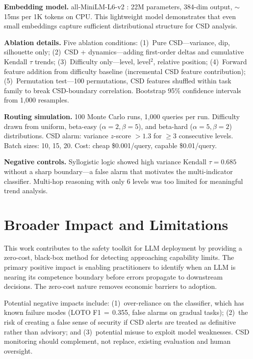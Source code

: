 \documentclass[11pt,letterpaper]{article}
\begin{document}
\textbf{Embedding model.} all-MiniLM-L6-v2 \cite{reimers2019}: 22M parameters, 384-dim output, ${\sim}$15ms per 1K tokens on CPU. This lightweight model demonstrates that even small embeddings capture sufficient distributional structure for CSD analysis.

\textbf{Ablation details.} Five ablation conditions: (1)~Pure CSD---variance, dip, silhouette only; (2)~CSD + dynamics---adding first-order deltas and cumulative Kendall $\tau$ trends; (3)~Difficulty only---level, level$^2$, relative position; (4)~Forward feature addition from difficulty baseline (incremental CSD feature contribution); (5)~Permutation test---100 permutations, CSD features shuffled within task family to break CSD-boundary correlation. Bootstrap 95\% confidence intervals from 1,000 resamples.

\textbf{Routing simulation.} 100 Monte Carlo runs, 1,000 queries per run. Difficulty drawn from uniform, beta-easy ($\alpha{=}2, \beta{=}5$), and beta-hard ($\alpha{=}5, \beta{=}2$) distributions. CSD alarm: variance $z$-score $> 1.3$ for $\geq 3$ consecutive levels. Batch sizes: 10, 15, 20. Cost: cheap \$0.001/query, capable \$0.01/query.

\textbf{Negative controls.} Syllogistic logic showed high variance Kendall $\tau{=}0.685$ without a sharp boundary---a false alarm that motivates the multi-indicator classifier. Multi-hop reasoning with only 6 levels was too limited for meaningful trend analysis.

\section{Broader Impact and Limitations}
\label{app:impact}

This work contributes to the safety toolkit for LLM deployment by providing a zero-cost, black-box method for detecting approaching capability limits. The primary positive impact is enabling practitioners to identify when an LLM is nearing its competence boundary before errors propagate to downstream decisions. The zero-cost nature removes economic barriers to adoption.

Potential negative impacts include: (1)~over-reliance on the classifier, which has known failure modes (LOTO F1$\,{=}\,$0.355, false alarms on gradual tasks); (2)~the risk of creating a false sense of security if CSD alerts are treated as definitive rather than advisory; and (3)~potential misuse to exploit model weaknesses. CSD monitoring should complement, not replace, existing evaluation and human oversight.
\end{document}
